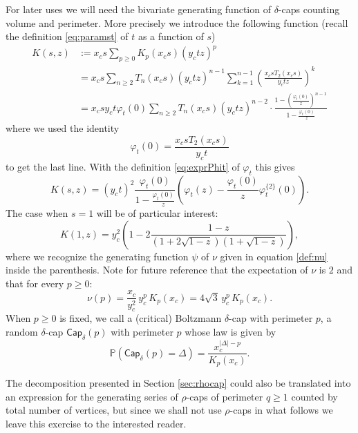 \documentclass[10pt]{amsart}
\theoremstyle{definition}\newtheorem{defi}[theo]{Definition}\newtheorem{rema}[theo]{Remark}\newtheorem{exam}[theo]{Example}\newtheorem{exem}[theo]{Example}\newtheorem{nota}[theo]{Notation}
\begin{document}
For later uses we will need the bivariate generating function of $\delta$-caps counting volume and perimeter. More precisely we introduce the following function (recall the definition \eqref{eq:paramst} of $t$ as a function of $s$)
\begin{align}
K(s,z) &:= x_c s \sum_{p\geq 0} K_p(x_c s) \left(y_c t z\right)^p\label{def:K} \\
&= x_c s \sum_{n \geq 2} T_n(x_c s) (y_c t z)^{n-1} \sum_{k=1}^{n-1} \left( \frac{x_c s T_2 (x_c s)}{y_c t z}\right)^k\nonumber \\
& = x_c s y_c t \varphi_t (0) \sum_{n \geq 2} T_n(x_c s) (y_c t z)^{n-2} \cdot \frac{1 - \left(\frac{\varphi_t (0)}{z}\right)^{n-1}}{1 - \frac{\varphi_t (0)}{z}} \nonumber
\end{align}
where we used the identity
\[
\varphi_t(0) = \frac{x_c s T_2(x_c s)}{y_c t}
\]
to get the last line. With the definition \eqref{eq:exprPhit} of $\varphi_t$ this gives
\begin{equation}
\label{eq:Ksz}
K(s,z) = (y_c t)^2 \frac{\varphi_t (0)}{1 - \frac{\varphi_t (0)}{z}} \left(\varphi_t(z) - \frac{\varphi_t(0)}{z} \varphi^{\{2\}}_t(0) \right).
\end{equation}
The case when $s=1$ will be of particular interest:
\[
K(1,z) = y_c^2 \left( 1-2\frac{1-z}{(1+2\sqrt{1-z})(1+\sqrt{1-z})} \right),
\]
where we recognize the generating function $\psi$ of $\nu$ given in equation \eqref{def:nu} inside the parenthesis. Note for future reference that the expectation of $\nu$ is $2$ and that for every $p \geq 0$:
\begin{equation}
\label{eq:nuval}
\nu(p) = \frac{x_c}{y_c^2} \, y_c^p \, K_p(x_c) = 4 \sqrt 3 \, y_c^p \, K_p(x_c).
\end{equation}
When $p \geq 0$ is fixed, we call a (critical) Boltzmann $\delta$-cap with perimeter $p$, a random $\delta$-cap $ \mathsf{Cap}_{\delta}(p)$ with perimeter $p$ whose law is given by
\begin{equation} \label{eq:BolKip}
\mathbb{P}(\mathsf{Cap}_{\delta}(p) = \Delta) = \frac{x_{c}^{|\Delta|-p}}{K_{p}(x_{c})}.
\end{equation}

\bigskip

The decomposition presented in Section \ref{sec:rhocap}  could also be translated into an expression for the generating series of $\rho$-caps of perimeter $q \geq 1$ counted by total number of vertices, but since we shall not use $\rho$-caps in what follows we leave this exercise to the interested reader.
\end{document}
